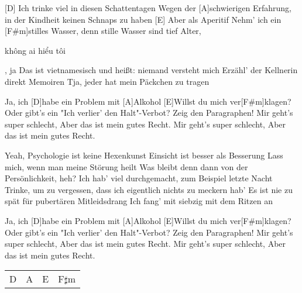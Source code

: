 



\begin{guitar}
	
	[D] Ich trinke viel in diesen Schattentagen
	Wegen der [A]schwierigen Erfahrung, in der Kindheit keinen Schnaps zu haben
	[E] Aber als Aperitif
	Nehm' ich ein [F#m]stilles Wasser, denn stille Wasser sind tief
	Alter, \begin{otherlanguage}{vietnamese}không ai hiểu tôi\end{otherlanguage}, ja
	Das ist vietnamesisch und heißt: niemand versteht mich
	Erzähl' der Kellnerin direkt Memoiren
	Tja, jeder hat mein Päckchen zu tragen
	
	Ja, ich [D]habe ein Problem mit [A]Alkohol
	[E]Willst du mich ver[F#m]klagen?
	Oder gibt's ein "Ich verlier' den Halt"\--Verbot?
	Zeig den Paragraphen!
	Mir geht's super schlecht,
	Aber das ist mein gutes Recht.
	Mir geht's super schlecht,
	Aber das ist mein gutes Recht.
	
	Yeah, Psychologie ist keine Hexenkunst
	Einsicht ist besser als Besserung
	Lass mich, wenn man meine Störung heilt
	Was bleibt denn dann von der Persönlichkeit, heh?
	Ich hab' viel durchgemacht, zum Beispiel letzte Nacht
	Trinke, um zu vergessen, dass ich eigentlich nichts zu meckern hab'
	Es ist nie zu spät für pubertären Mitleidsdrang
	Ich fang' mit siebzig mit dem Ritzen an
	
	Ja, ich [D]habe ein Problem mit [A]Alkohol
	[E]Willst du mich ver[F#m]klagen?
	Oder gibt's ein "Ich verlier' den Halt"\--Verbot?
	Zeig den Paragraphen!
	Mir geht's super schlecht,
	Aber das ist mein gutes Recht.
	Mir geht's super schlecht,
	Aber das ist mein gutes Recht.
	
	{\footnotesize\begin{tabular}{l|l|l|l}
			D & A & E & F$\sharp$m
	\end{tabular}}
	

\end{guitar}
